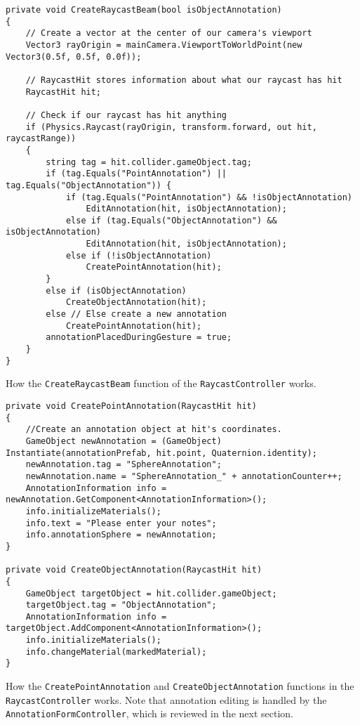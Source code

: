 \begin{table}
\label{table:create_raycast}
\lstset{style=csharp}
\begin{lstlisting}
private void CreateRaycastBeam(bool isObjectAnnotation)
{
    // Create a vector at the center of our camera's viewport
    Vector3 rayOrigin = mainCamera.ViewportToWorldPoint(new Vector3(0.5f, 0.5f, 0.0f));

    // RaycastHit stores information about what our raycast has hit
    RaycastHit hit;

    // Check if our raycast has hit anything
    if (Physics.Raycast(rayOrigin, transform.forward, out hit, raycastRange))
    {
        string tag = hit.collider.gameObject.tag;    
        if (tag.Equals("PointAnnotation") || tag.Equals("ObjectAnnotation")) {
            if (tag.Equals("PointAnnotation") && !isObjectAnnotation)
                EditAnnotation(hit, isObjectAnnotation);
            else if (tag.Equals("ObjectAnnotation") && isObjectAnnotation)
                EditAnnotation(hit, isObjectAnnotation);
            else if (!isObjectAnnotation)
                CreatePointAnnotation(hit);
        }
        else if (isObjectAnnotation)
            CreateObjectAnnotation(hit);
        else // Else create a new annotation
            CreatePointAnnotation(hit);
        annotationPlacedDuringGesture = true;
    }
} 
\end{lstlisting}
\caption[How the \texttt{CreateRaycastBeam} function of the \texttt{RaycastController} works.]{How the \texttt{CreateRaycastBeam} function of the \texttt{RaycastController} works.} 
\end{table}


\begin{table}
\label{table:create_annotations}
\lstset{style=csharp}
\begin{lstlisting}
private void CreatePointAnnotation(RaycastHit hit)
{
    //Create an annotation object at hit's coordinates. 
    GameObject newAnnotation = (GameObject) Instantiate(annotationPrefab, hit.point, Quaternion.identity);
    newAnnotation.tag = "SphereAnnotation";
    newAnnotation.name = "SphereAnnotation_" + annotationCounter++;
    AnnotationInformation info = newAnnotation.GetComponent<AnnotationInformation>();
    info.initializeMaterials();
    info.text = "Please enter your notes";
    info.annotationSphere = newAnnotation;
}

private void CreateObjectAnnotation(RaycastHit hit)
{
    GameObject targetObject = hit.collider.gameObject;
    targetObject.tag = "ObjectAnnotation";
    AnnotationInformation info = targetObject.AddComponent<AnnotationInformation>();
    info.initializeMaterials();
    info.changeMaterial(markedMaterial);
}
\end{lstlisting}
\caption[How the \texttt{CreatePointAnnotation} and \texttt{CreateObjectAnnotation} functions in the \texttt{RaycastController} works.]
{How the \texttt{CreatePointAnnotation} and \texttt{CreateObjectAnnotation} functions in the \texttt{RaycastController} works.
Note that annotation editing is handled by the \texttt{AnnotationFormController}, which is reviewed in the next section.}
\end{table}

